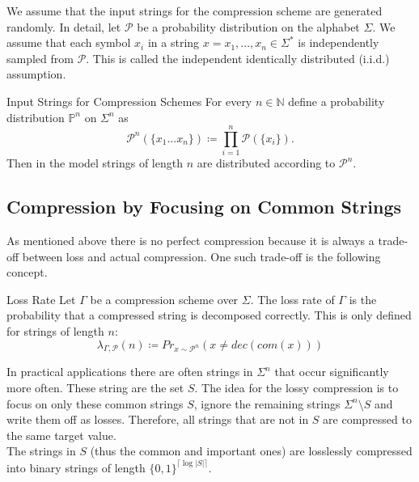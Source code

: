 \documentclass[english]{panikzettel}
\begin{document}
\begin{halfboxl}
\vspace{-\baselineskip}
	We assume that the input strings for the compression scheme are generated randomly. In detail, let $\mathcal{P}$ be a probability distribution on the alphabet $\Sigma$. We assume that each symbol $x_i$ in a string $x=x_1,...,x_n\in\Sigma^*$ is independently sampled from $\mathcal{P}$. This is called the independent identically distributed (i.i.d.) assumption.
\end{halfboxl}
\begin{halfboxr}
\vspace{-\baselineskip}
	\begin{defi}{Input Strings for Compression Schemes}
	For every $n\in\mathbb{N}$ define a probability distribution $\mathbb{P}^n$ on $\Sigma^n$ as
	\[
	\mathcal{P}^n(\{x_1 ... x_n \})\coloneqq \prod_{i=1}^n \mathcal{P}(\{x_i \}).
	\]
	Then in the model strings of length $n$ are distributed according to $\mathcal{P}^n$.
	\end{defi}
\end{halfboxr}

\subsection{Compression by Focusing on Common Strings}
As mentioned above there is no perfect compression because it is always a trade-off between loss and actual compression. One such trade-off is the following concept.

\begin{defi}{Loss Rate}
Let $\Gamma$ be a compression scheme over $\Sigma$. The loss rate of $\Gamma$ is the probability that a compressed string is decomposed correctly. This is only defined for strings of length $n$:
\[
\lambda_{\Gamma, \mathcal{P}}(n)\coloneqq Pr_{x \sim \mathcal{P}^n}(x \neq dec(com(x)))
\]
\end{defi}

In practical applications there are often strings in $\Sigma^n$ that occur significantly more often. These string are the set $S$. The idea for the lossy compression is to focus on only these common strings $S$, ignore the remaining strings $\Sigma^n \setminus S$ and write them off as losses. Therefore, all strings that are not in $S$ are compressed to the same target value.\\
The strings in $S$ (thus the common and important ones) are losslessly compressed into binary strings of length $\{0,1 \}^{\lceil\log |S| \rceil}$.
\end{document}
